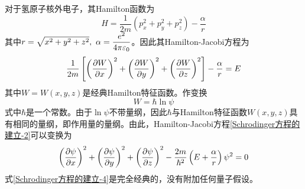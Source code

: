对于氢原子核外电子，其Hamilton函数为
\begin{equation}
	H = \frac{1}{2m}(p_x^2+p_y^2+p_z^2) - \frac{\alpha}{r}
	\label{Schrodinger方程的建立-1}
\end{equation}
其中$r = \sqrt{x^2+y^2+z^2},~ \alpha = \dfrac{e^2}{4\pi \varepsilon_0}$。因此其Hamilton-Jacobi方程为
\begin{equation}
	\frac{1}{2m}\left[\left(\frac{\partial W}{\partial x}\right)^2+ \left(\frac{\partial W}{\partial y}\right)^2 + \left(\frac{\partial W}{\partial z}\right)^2\right] - \frac{\alpha}{r} = E
	\label{Schrodinger方程的建立-2}
\end{equation}
其中$W = W(x,y,z)$是经典Hamilton特征函数。作变换
\begin{equation}
	W = \hbar \ln \psi
	\label{Schrodinger方程的建立-3}
\end{equation}
式中$\hbar$是一个常数。由于$\ln \psi$不带量纲，因此$\hbar$与Hamilton特征函数$W(x,y,z)$具有相同的量纲，即作用量的量纲。由此，Hamilton-Jacobi方程\eqref{Schrodinger方程的建立-2}可以变换为
\begin{equation}
	\left(\frac{\partial \psi}{\partial x}\right)^2 + \left(\frac{\partial \psi}{\partial y}\right)^2 + \left(\frac{\partial \psi}{\partial z}\right)^2 - \frac{2m}{\hbar^2}\left(E+\frac{\alpha}{r}\right)\psi^2 = 0
	\label{Schrodinger方程的建立-4}
\end{equation}
式\eqref{Schrodinger方程的建立-4}是完全经典的，没有附加任何量子假设。

